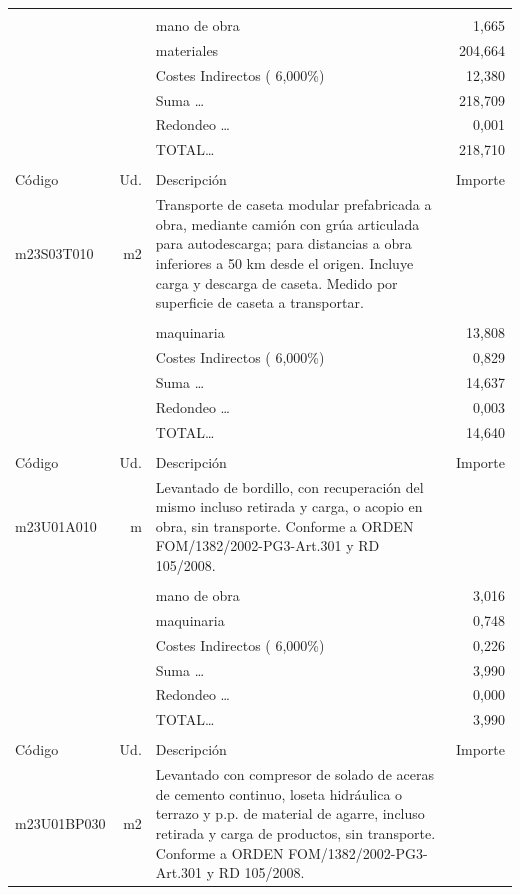 \documentclass{book}%
\begin{document}
\begin{supertabular}{l r p{60mm} r}
&&&\\%
&&mano de obra&     1,665\\%
&&materiales&   204,664\\%
&&Costes Indirectos (     6,000\%)&    12,380\\%
&&Suma \ldots&   218,709\\%
&&Redondeo \ldots&     0,001\\%
%
&&TOTAL\ldots&   218,710\\%
&&&\\%
Código&Ud.&Descripción&Importe\\%
\hline%
m23S03T010&m2&Transporte de caseta modular prefabricada a obra, mediante camión con grúa articulada para autodescarga; para distancias a obra inferiores a 50 km desde el origen. Incluye carga y descarga de caseta. Medido por superficie de caseta a transportar.&\\%
&&&\\%
&&maquinaria&    13,808\\%
&&Costes Indirectos (     6,000\%)&     0,829\\%
&&Suma \ldots&    14,637\\%
&&Redondeo \ldots&     0,003\\%
%
&&TOTAL\ldots&    14,640\\%
&&&\\%
Código&Ud.&Descripción&Importe\\%
\hline%
m23U01A010&m&Levantado de bordillo, con recuperación del mismo incluso retirada y carga, o acopio en obra, sin transporte. Conforme a ORDEN FOM/1382/2002{-}PG3{-}Art.301 y RD 105/2008.&\\%
&&&\\%
&&mano de obra&     3,016\\%
&&maquinaria&     0,748\\%
&&Costes Indirectos (     6,000\%)&     0,226\\%
&&Suma \ldots&     3,990\\%
&&Redondeo \ldots&     0,000\\%
%
&&TOTAL\ldots&     3,990\\%
&&&\\%
Código&Ud.&Descripción&Importe\\%
\hline%
m23U01BP030&m2&Levantado con compresor de solado de aceras de cemento continuo, loseta hidráulica o terrazo y p.p. de material de agarre, incluso retirada y carga de productos, sin transporte. Conforme a ORDEN FOM/1382/2002{-}PG3{-}Art.301 y RD 105/2008.&\\%

\end{supertabular}
\end{document}

